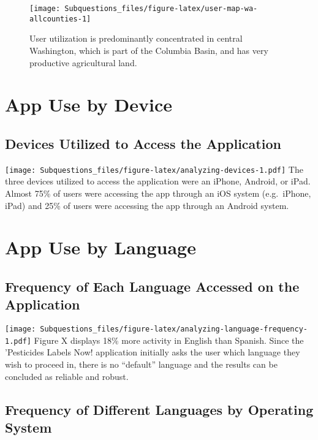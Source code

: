\documentclass[
]{article}
\begin{document}
\begin{figure}
\texttt{[image: Subquestions\_files/figure-latex/user-map-wa-allcounties-1]} \caption{User utilization is predominantly concentrated in central Washington, which is part of the Columbia Basin, and has very productive agricultural land.}\label{fig:user-map-wa-allcounties}
\end{figure}

\hypertarget{app-use-by-device}{%
\section{App Use by Device}\label{app-use-by-device}}

\hypertarget{devices-utilized-to-access-the-application}{%
\subsection{Devices Utilized to Access the
Application}\label{devices-utilized-to-access-the-application}}

\texttt{[image: Subquestions\_files/figure-latex/analyzing-devices-1.pdf]}
The three devices utilized to access the application were an iPhone,
Android, or iPad. Almost 75\% of users were accessing the app through an
iOS system (e.g.~iPhone, iPad) and 25\% of users were accessing the app
through an Android system.

\hypertarget{app-use-by-language}{%
\section{App Use by Language}\label{app-use-by-language}}

\hypertarget{frequency-of-each-language-accessed-on-the-application}{%
\subsection{Frequency of Each Language Accessed on the
Application}\label{frequency-of-each-language-accessed-on-the-application}}

\texttt{[image: Subquestions\_files/figure-latex/analyzing-language-frequency-1.pdf]}
Figure X displays 18\% more activity in English than Spanish. Since the
'Pesticides Labels Now! application initially asks the user which
language they wish to proceed in, there is no ``default'' language and
the results can be concluded as reliable and robust.

\hypertarget{frequency-of-different-languages-by-operating-system}{%
\subsection{Frequency of Different Languages by Operating
System}\label{frequency-of-different-languages-by-operating-system}}
\end{document}
